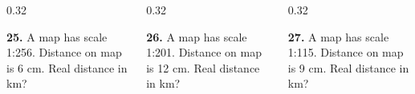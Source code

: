 \documentclass[aspectratio=169,12pt]{beamer}
\newcommand{\MMProblem}[2]{\begin{MMProblemCard}\raggedright\small\textbf{#1.} #2\par\end{MMProblemCard}}
\begin{document}
\begin{frame}[t]
\vspace{0.05em}
\begin{columns}[T,onlytextwidth]
\begin{column}{0.32\textwidth}\MMProblem{25}{A map has scale 1:256. Distance on map is 6 cm. Real distance in km?}\end{column}
\begin{column}{0.32\textwidth}\MMProblem{26}{A map has scale 1:201. Distance on map is 12 cm. Real distance in km?}\end{column}
\begin{column}{0.32\textwidth}\MMProblem{27}{A map has scale 1:115. Distance on map is 9 cm. Real distance in km?}\end{column}
\end{columns}
\end{frame}
\end{document}
